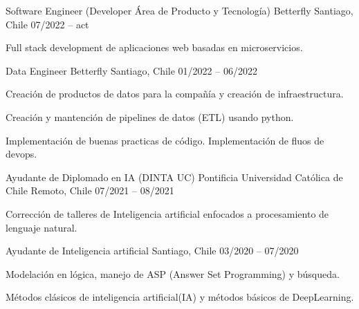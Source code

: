 \begin{cventries}
\cventry
{Software Engineer (Developer Área de Producto y Tecnología)} %
{Betterfly} %
{Santiago, Chile} %
{07/2022 – act} %
{
  \begin{cvitems} %
    \item {Full stack development de aplicaciones web basadas en microservicios.}
  \end{cvitems}
}
\newline
\cventry
  {Data Engineer} %
  {Betterfly} %
  {Santiago, Chile} %
  {01/2022 – 06/2022} %
  {
    \begin{cvitems} %
      \item {Creación de productos de datos para la compañía y creación de infraestructura.}
      \item {Creación y mantención de pipelines de datos (ETL) usando python.}
      \item {Implementación de buenas practicas de código. Implementación de fluos de devops.}
    \end{cvitems}
  }
  \newline
\cventry
  {Ayudante de Diplomado en IA (DINTA UC)} %
  {Pontificia Universidad Católica de Chile} %
  {Remoto, Chile} %
  {07/2021 – 08/2021} %
  {
    \begin{cvitems} %
      \item {Corrección de talleres de Inteligencia artificial enfocados a procesamiento de lenguaje natural.}
    \end{cvitems}
  }
  \newline
  \cventry
    {Ayudante de Inteligencia artificial} %
    {} %
    {Santiago, Chile} %
    {03/2020 – 07/2020} %
    {
      \begin{cvitems} %
        \item {Modelación en lógica, manejo de ASP (Answer Set Programming) y búsqueda.}
        \item {Métodos clásicos de inteligencia artificial(IA) y métodos básicos de DeepLearning.}
      \end{cvitems}
    }
    \newline


\end{cventries}
